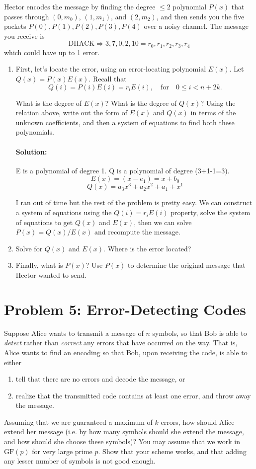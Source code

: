 \documentclass[11pt, notitlepage]{report}
\newcommand{\Question}[1]{\newpage\section{#1}}
\newenvironment{solution}{\paragraph{Solution:}}{\hfill}
\begin{document}
Hector encodes the message by finding the degree $\leq 2$ polynomial $P(x)$ that passes through $(0,m_0)$, $(1,m_1)$, and $(2,m_2)$, and then sends you the five packets $P(0),P(1),P(2),P(3),P(4)$ over a noisy channel. The message you receive is
$$\text{DHACK} \Rightarrow 3,7,0,2,10 = r_0,r_1,r_2,r_3,r_4$$
which could have up to 1 error.

\begin{enumerate}[label=\alph*)]
\item First, let's locate the error, using an error-locating polynomial $E(x)$.  Let $Q(x) = P(x)E(x)$. Recall that
$$Q(i) = P(i)E(i) = r_i E(i), \quad \text{for} \quad 0 \leq i < n+2k.$$

What is the degree of $E(x)$? What is the degree of $Q(x)$? Using the relation above, write out the form of $E(x)$ and $Q(x)$ in terms of the unknown coefficients, and then a system of equations to find both these polynomials.
\begin{solution}
	E is a polynomial of degree 1. Q is a polynomial of degree (3+1-1=3).
	\[E(x)=(x-e_1)=x+b_0\]
	\[Q(x)=a_3x^3+a_2x^2+a_1+x^1\]
	
	I ran out of time but the rest of the problem is pretty easy. We can construct a system of equations using the $Q(i)=r_iE(i)$ property, solve the system of equations to get $Q(x)$ and $E(x)$, then we can solve $P(x)=Q(x)/E(x)$ and recompute the message.
\end{solution}

 \item Solve for $Q(x)$ and $E(x)$. Where is the error located? 


 \item Finally, what is $P(x)$? Use $P(x)$ to determine the original message that Hector wanted to send. 
 
\end{enumerate}

\Question{Problem 5: Error-Detecting Codes}
Suppose Alice wants to transmit a message of $n$ symbols, so that Bob
is able to \textit{detect} rather than \textit{correct} any errors that have occurred on the way. That is, Alice wants to find an encoding so that Bob, upon receiving the code, is able to either
\begin{enumerate}[label=\roman*.)]
    \item tell that there are no errors and decode the message, or
    \item realize that the transmitted code contains at least one error, and throw away the 
        message.
\end{enumerate}
Assuming that we are guaranteed a maximum of $k$ errors, how should Alice extend
her message (i.e. by how many symbols should she extend the message, and how
should she choose these symbols)? You may assume that we work in
$\mathrm{GF}(p)$ for very large prime $p$. Show that your scheme works, and that
adding any lesser number of symbols is not good enough.
\end{document}
